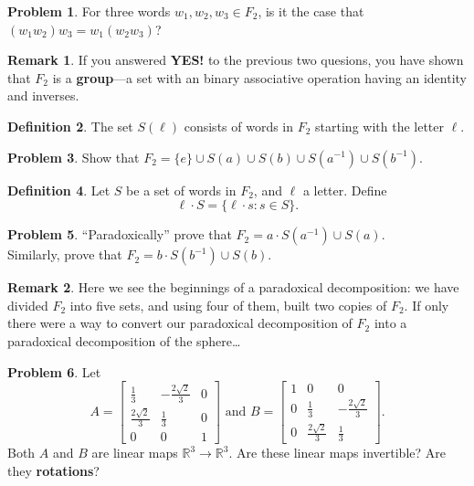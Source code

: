 \documentclass[12pt]{article}
\newcommand{\R}{\mathbb{R}}
\theoremstyle{definition}
\newtheorem{problem}{Problem}
\newtheorem{definition}[problem]{Definition}
\newtheorem*{remark}{Remark}
\begin{document}
\begin{problem}
  For three words $w_1, w_2, w_3 \in F_2$, is it the case that $(w_1
  w_2) w_3 = w_1 (w_2 w_3)$?
\end{problem}

\begin{remark}
  If you answered \textbf{YES!} to the previous two quesions, you have
  shown that $F_2$ is a \textbf{group}---a set with an binary
  associative operation having an identity and inverses.
\end{remark}

\begin{definition}
The set $S(\ell)$ consists of words in $F_2$ starting with the letter $\ell$.
\end{definition}

\begin{problem}
Show that $F_2 = \{ e \} \cup S(a) \cup S(b) \cup S(a^{-1}) \cup S(b^{-1})$.
\end{problem}

\begin{definition}
Let $S$ be a set of words in $F_2$, and $\ell$ a letter.  Define
$$
\ell \cdot S = \{ \ell \cdot s : s \in S \}.
$$
\end{definition}

\begin{problem}
``Paradoxically'' prove that $F_2 = a \cdot S(a^{-1}) \cup S(a)$. \\
Similarly, prove that $F_2 = b \cdot S(b^{-1}) \cup S(b)$. \\
\end{problem}

\begin{remark}
  Here we see the beginnings of a paradoxical decomposition: we have
  divided $F_2$ into five sets, and using four of them, built two
  copies of $F_2$.  If only there were a way to convert our
  paradoxical decomposition of $F_2$ into a paradoxical decomposition
  of the sphere\ldots
\end{remark}

\begin{problem}
Let
$$
A = \begin{bmatrix}
\frac{1}{3} & - \frac{2 \sqrt{2}}{3} & 0 \\
\frac{2 \sqrt{2}}{3} & \frac{1}{3} & 0 \\
0 & 0 & 1
\end{bmatrix} \mbox{ and }
B = \begin{bmatrix}
1 & 0 & 0 \\
0 & \frac{1}{3} & - \frac{2 \sqrt{2}}{3} \\
0 & \frac{2 \sqrt{2}}{3} & \frac{1}{3}
\end{bmatrix}.
$$
Both $A$ and $B$ are linear maps $\R^3 \to \R^3$.  Are these linear maps invertible?  Are they \textbf{rotations}?
\end{problem}
\end{document}
